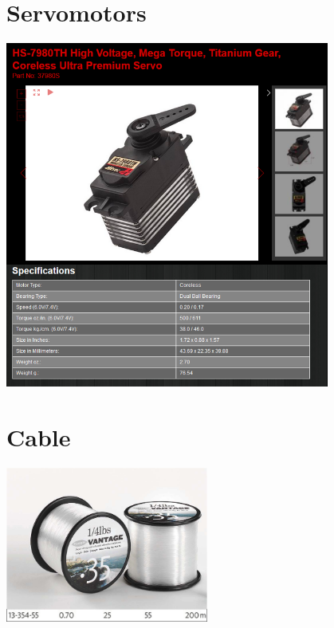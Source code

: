 \documentclass[11pt]{article}
\begin{document}
\begin{appendices}

\section{Servomotors}
\label{appendix:servos}

\begin{center}
\includegraphics[width=0.8\textwidth]{images/servoSpecs.png}
\label{figure:servoSpes}
\end{center}

\section{Cable}
\label{appendix:cable}

\begin{center}
\includegraphics[width=0.5\textwidth]{images/cable.png}
\label{figure:cable}
\end{center}


\end{appendices}
\end{document}
